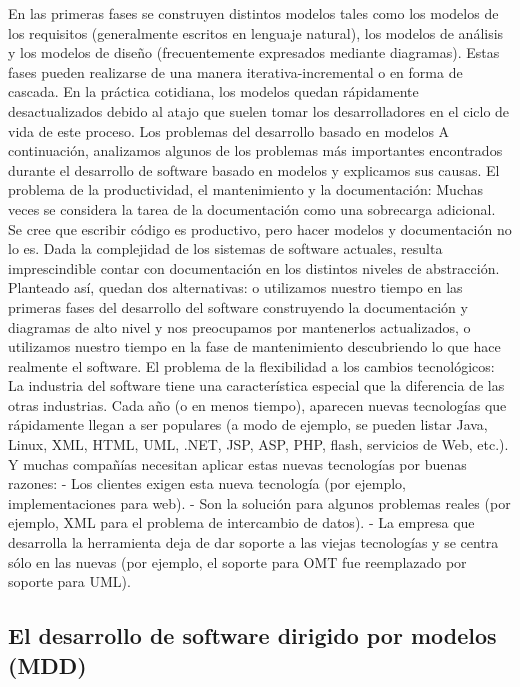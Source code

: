 \begin{flushleft}
\begin{itemize}
En las primeras fases se construyen distintos modelos tales como los modelos de los requisitos (generalmente escritos en lenguaje natural), los modelos de análisis y los modelos de diseño (frecuentemente expresados mediante diagramas). Estas fases pueden realizarse de una manera iterativa-incremental o en forma de cascada. En la práctica cotidiana, los modelos quedan rápidamente desactualizados debido al atajo que suelen tomar los desarrolladores en el ciclo de vida de este proceso.
Los problemas del desarrollo basado en modelos 
A continuación, analizamos algunos de los problemas más importantes encontrados durante el desarrollo de software basado en modelos y explicamos sus causas.
El problema de la productividad, el mantenimiento y la documentación: Muchas veces se considera la tarea de la documentación como una sobrecarga adicional. Se cree que escribir código es productivo, pero hacer modelos y documentación no lo es. Dada la complejidad de los sistemas de software actuales, resulta imprescindible contar con documentación en los distintos niveles de abstracción. Planteado así, quedan dos alternativas: o utilizamos nuestro tiempo en las primeras fases del desarrollo del software construyendo la documentación y diagramas de alto nivel y nos preocupamos por mantenerlos actualizados, o utilizamos nuestro tiempo en la fase de mantenimiento descubriendo lo que hace realmente el software.
El problema de la flexibilidad a los cambios tecnológicos: La industria del software tiene una característica especial que la diferencia de las otras industrias. Cada año (o en menos tiempo), aparecen nuevas tecnologías que rápidamente llegan a ser populares (a modo de ejemplo, se pueden listar Java, Linux, XML, HTML, UML, .NET, JSP, ASP, PHP, flash, servicios de Web, etc.). Y muchas compañías necesitan aplicar estas nuevas tecnologías por buenas razones: - Los clientes exigen esta nueva tecnología (por ejemplo, implementaciones para web). - Son la solución para algunos problemas reales (por ejemplo, XML para el problema de intercambio de datos). - La empresa que desarrolla la herramienta deja de dar soporte a las viejas tecnologías y se centra sólo en las nuevas (por ejemplo, el soporte para OMT fue reemplazado por soporte para UML).




\subsection{El desarrollo de software dirigido por modelos (MDD)}


\end{itemize}
\end{flushleft}
